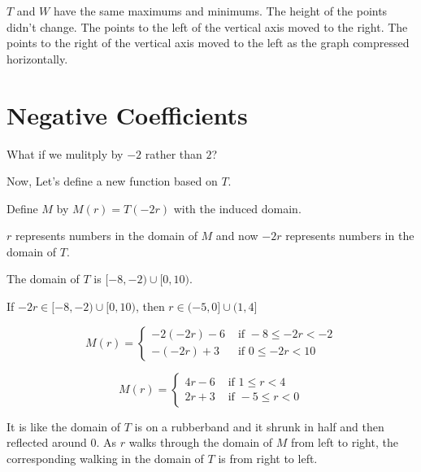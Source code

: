 \documentclass{ximera}
\begin{document}
$T$ and $W$ have the same maximums and minimums.  The height of the points didn't change.  The points to the left of the vertical axis moved to the right. The points to the right of the vertical axis moved to the left as the graph compressed horizontally.






\section{Negative Coefficients}


What if we mulitply by $-2$ rather than $2$?













Now, Let's define a new function based on $T$.



Define $M$ by $M(r) = T(-2r)$ with the induced domain.



$r$ represents numbers in the domain of $M$ and now $-2r$ represents numbers in the domain of $T$.  

The domain of $T$ is $[-8,-2) \cup [0,10)$.


If $-2r \in [-8,-2) \cup [0,10)$, then $r \in (-5,0] \cup (1, 4]$








\[
M(r) = 
\begin{cases}
  -2(-2r)-6    & \text{ if }  -8 \leq -2r < -2 \\
  -(-2r)+3   & \text{ if } 0 \leq -2r < 10
\end{cases}
\]





\[
M(r) = 
\begin{cases}
  4r-6    & \text{ if }  1 \leq r < 4 \\
  2r + 3   & \text{ if } -5 \leq r < 0
\end{cases}
\]








It is like the domain of $T$ is on a rubberband and it shrunk in half and then reflected around $0$.  As $r$ walks through the domain of $M$ from left to right, the corresponding walking in the domain of $T$ is from right to left.
\end{document}

